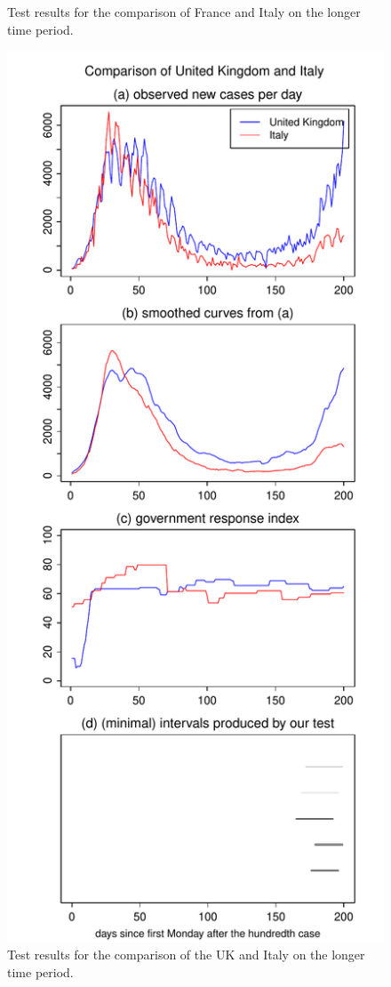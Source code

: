 \documentclass[a4paper,12pt]{article}
\numberwithin{equation}{section}
\begin{document}
{\begin{figure}[h!]
\begin{minipage}[t]{0.49\textwidth}
\caption{Test results for the comparison of France and Italy on the longer time period.}
\end{minipage}
\hspace{0.25cm}
\begin{minipage}[t]{0.49\textwidth}
\includegraphics[width=\textwidth]{plots/GBR_vs_ITA_long}
\caption{Test results for the comparison of the UK and Italy on the longer time period.}
\end{minipage}
\end{figure}


}
\end{document}
